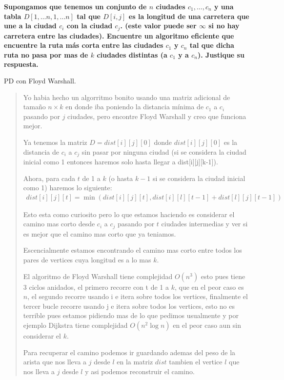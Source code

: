 \textbf{
    Supongamos que tenemos un conjunto de $n$ ciudades $c_1, \dots, c_n$
    y una tabla $D[1,\dots n, 1, \dots n]$ tal que $D[i,j]$ es la longitud
    de una carretera que une a la ciudad $c_i$ con la ciudad $c_j$. (este
    valor puede ser $\infty$ si no hay carretera entre las ciudades). 
    Encuentre un algoritmo eficiente que encuentre la ruta más corta entre 
    las ciudades $c_1$ y $c_n$ tal que dicha ruta no pasa por mas de $k$ ciudades
    distintas (a $c_1$ y a $c_n$). Justique su respuesta.
}
\vspace{.2cm}

\textcolor{bibi}{PD con Floyd Warshall.}
\begin{quote}
    Yo habia hecho un algorritmo bonito usando una matriz adicional de tamaño $n \times k$ en donde iba poniendo la distancia mínima de $c_1$ a $c_i$ pasando por $j$ ciudades, pero encontre Floyd Warshall y creo que funciona mejor. \vspace{.2cm}

    Ya tenemos la matriz $D=dist[i][j][0]$ donde $dist[i][j][0]$ es la distancia de $c_i$ a $c_j$ sin pasar por ninguna ciudad (si se considera la ciudad inicial como 1 entonces haremos solo hasta llegar a dist[i][j][k-1]). \vspace{.2cm}
    
    Ahora, para cada $t$ de 1 a $k$ (o hasta $k-1$ si se considera la ciudad inicial como 1) haremos lo siguiente: 
    \begin{align*}
        dist[i][j][t] = \min(dist[i][j][t], dist[i][l][t-1] + dist[l][j][t-1])
    \end{align*}

    Esto esta como curiosito pero lo que estamos haciendo es considerar el camino mas corto desde $c_i$ a $c_j$ pasando por $t$ ciudades intermedias y ver si es mejor que el camino mas corto que ya teniamos. \vspace{.2cm}

    Escencialmente estamos encontrando el camino mas corto entre todos los pares de vertices cuya longitud es a lo mas $k$. \vspace{.2cm}

    El algoritmo de Floyd Warshall tiene complejidad $O(n^3)$ esto pues tiene 3 ciclos anidados, el primero recorre con t de 1 a $k$, que en el peor caso es $n$, el segundo recorre usando i e itera sobre todos los vertices, finalmente el tercer bucle recorre usando j e itera sobre todos los vertices, esto no es terrible pues estamos pidiendo mas de lo que pedimos usualmente y por ejemplo Dijkstra tiene complejidad $O(n^2 \log n)$ en el peor caso aun sin considerar el $k$.

    Para recuperar el camino podemos ir guardando ademas del peso de la arista que nos lleva a $j$ desde $l$ en la matriz $dist$ tambien el vertice $l$ que nos lleva a $j$ desde $l$ y asi podemos reconstruir el camino.
\end{quote}